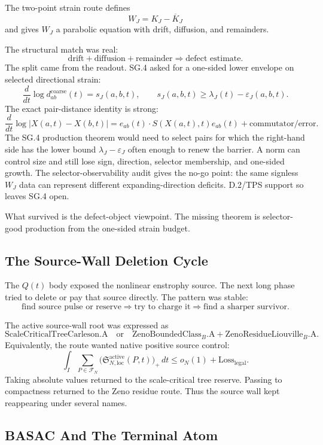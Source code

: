 The two-point strain route defines
\[
  W_J=K_J-\overline K_J
\]
and gives \(W_J\) a parabolic equation with drift, diffusion, and remainders.

The structural match was real:
\[
  \text{drift}+\text{diffusion}+\text{remainder}
  \Longrightarrow
  \text{defect estimate}.
\]
The split came from the readout.
SG.4 asked for a one-sided lower envelope on selected directional strain:
\[
  \frac{d}{dt}\log d_{ab}^{\mathrm{coarse}}(t)
  =
  s_J(a,b,t),
  \qquad
  s_J(a,b,t)\ge\lambda_J(t)-\varepsilon_J(a,b,t).
\]
The exact pair-distance identity is strong:
\[
  \frac{d}{dt}\log |X(a,t)-X(b,t)|
  =
  e_{ab}(t)\cdot S(X(a,t),t)e_{ab}(t)
  +\mathrm{commutator/error}.
\]
The SG.4 production theorem would need to select pairs for which the
right-hand side has the lower bound \(\lambda_J-\varepsilon_J\) often enough
to renew the barrier.
A norm can control size and still lose sign, direction, selector membership,
and one-sided growth.
The selector-observability audit gives the no-go point:
the same signless \(W_J\) data can represent different expanding-direction
deficits.
D.2/TPS support so leaves SG.4 open.

What survived is the defect-object viewpoint.
The missing theorem is selector-good production from the one-sided strain
budget.

\subsection{The Source-Wall Deletion Cycle}

The \(Q(t)\) body exposed the nonlinear enstrophy source.
The next long phase tried to delete or pay that source directly.
The pattern was stable:
\[
  \text{find source pulse or reserve}
  \Longrightarrow
  \text{try to charge it}
  \Longrightarrow
  \text{find a sharper survivor}.
\]

The active source-wall root was expressed as
\[
  \text{ScaleCriticalTreeCarleson.A}
  \quad\text{or}\quad
  \text{ZenoBoundedClass}_{B}\text{.A}
  +\text{ZenoResidueLiouville}_{B}\text{.A}.
\]
Equivalently, the route wanted native positive source control:
\[
  \int_I
  \sum_{P\in\mathcal F_N}
  \bigl(\mathfrak S^{\mathrm{active}}_{N,\mathrm{loc}}(P,t)\bigr)_+\,dt
  \le
  o_N(1)+\mathrm{Loss}_{\mathrm{legal}} .
\]
Taking absolute values returned to the scale-critical tree reserve.
Passing to compactness returned to the Zeno residue route.
Thus the source wall kept reappearing under several names.

\subsection{BASAC And The Terminal Atom}

